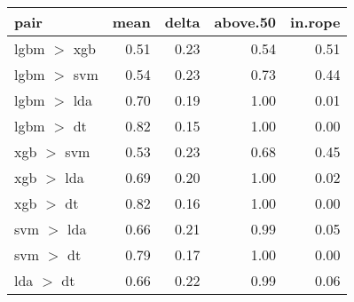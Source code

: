 \begin{tabular}{lrrrr}
  \toprule
{\bfseries pair} & {\bfseries mean} & {\bfseries delta} & {\bfseries above.50} & {\bfseries in.rope} \\ 
  \midrule
lgbm $>$ xgb & 0.51 & 0.23 & 0.54 & 0.51 \\ 
  lgbm $>$ svm & 0.54 & 0.23 & 0.73 & 0.44 \\ 
  lgbm $>$ lda & 0.70 & 0.19 & 1.00 & 0.01 \\ 
  lgbm $>$ dt & 0.82 & 0.15 & 1.00 & 0.00 \\ 
  xgb $>$ svm & 0.53 & 0.23 & 0.68 & 0.45 \\ 
  xgb $>$ lda & 0.69 & 0.20 & 1.00 & 0.02 \\ 
  xgb $>$ dt & 0.82 & 0.16 & 1.00 & 0.00 \\ 
  svm $>$ lda & 0.66 & 0.21 & 0.99 & 0.05 \\ 
  svm $>$ dt & 0.79 & 0.17 & 1.00 & 0.00 \\ 
  lda $>$ dt & 0.66 & 0.22 & 0.99 & 0.06 \\ 
   \bottomrule
\end{tabular}
